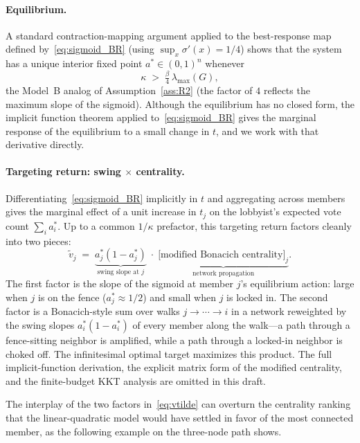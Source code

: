 \documentclass[11pt,letterpaper]{article}
\theoremstyle{plain}
\theoremstyle{definition}
\theoremstyle{remark}
\begin{document}
\paragraph{Equilibrium.} A standard contraction-mapping argument applied to the best-response map defined by~\eqref{eq:sigmoid_BR} (using $\sup_x \sigma'(x) = 1/4$) shows that the system has a unique interior fixed point $a^* \in (0,1)^n$ whenever
\begin{equation}
\kappa \;>\; \tfrac{\beta}{4}\, \lambda_{\max}(G),
\label{eq:spectral_B}
\end{equation}
the Model~B analog of Assumption~\ref{ass:R2} (the factor of $4$ reflects the maximum slope of the sigmoid). Although the equilibrium has no closed form, the implicit function theorem applied to~\eqref{eq:sigmoid_BR} gives the marginal response of the equilibrium to a small change in $t$, and we work with that derivative directly.

\paragraph{Targeting return: swing $\times$ centrality.} Differentiating~\eqref{eq:sigmoid_BR} implicitly in $t$ and aggregating across members gives the marginal effect of a unit increase in $t_j$ on the lobbyist's expected vote count $\sum_i a_i^*$. Up to a common $1/\kappa$ prefactor, this targeting return factors cleanly into two pieces:
\begin{equation}
\tilde v_j \;=\; \underbrace{a_j^*(1 - a_j^*)}_{\text{swing slope at }j} \;\cdot\; \underbrace{\bigl[\text{modified Bonacich centrality}\bigr]_j}_{\text{network propagation}}.
\label{eq:vtilde}
\end{equation}
The first factor is the slope of the sigmoid at member $j$'s equilibrium action: large when $j$ is on the fence ($a_j^* \approx 1/2$) and small when $j$ is locked in. The second factor is a Bonacich-style sum over walks $j \to \cdots \to i$ in a network reweighted by the swing slopes $a_i^*(1 - a_i^*)$ of every member along the walk---a path through a fence-sitting neighbor is amplified, while a path through a locked-in neighbor is choked off. The infinitesimal optimal target maximizes this product. The full implicit-function derivation, the explicit matrix form of the modified centrality, and the finite-budget KKT analysis are omitted in this draft.

The interplay of the two factors in~\eqref{eq:vtilde} can overturn the centrality ranking that the linear-quadratic model would have settled in favor of the most connected member, as the following example on the three-node path shows.
\end{document}
